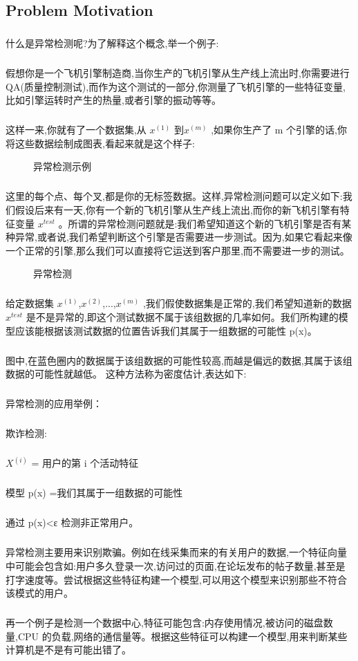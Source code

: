 \documentclass{article}
\begin{document}
\begin{CJK}{UTF8}{gbsn}
\subsection{Problem Motivation}
\subparagraph{}
什么是异常检测呢?为了解释这个概念,举一个例子:
\subparagraph{}
假想你是一个飞机引擎制造商,当你生产的飞机引擎从生产线上流出时,你需要进行 QA(质量控制测试),而作为这个测试的一部分,你测量了飞机引擎的一些特征变量,比如引擎运转时产生的热量,或者引擎的振动等等。
\subparagraph{}
这样一来,你就有了一个数据集,从 $x^{(1)}$ 到$x^{(m)}$  ,如果你生产了 m 个引擎的话,你将这些数据绘制成图表,看起来就是这个样子:
\begin{figure}[H]
\caption{异常检测示例}
\label{fig:901}
\end{figure}
\subparagraph{}
这里的每个点、每个叉,都是你的无标签数据。这样,异常检测问题可以定义如下:我们假设后来有一天,你有一个新的飞机引擎从生产线上流出,而你的新飞机引擎有特征变量 $x^{test}$ 。所谓的异常检测问题就是:我们希望知道这个新的飞机引擎是否有某种异常,或者说,我们希望判断这个引擎是否需要进一步测试。因为,如果它看起来像一个正常的引擎,那么我们可以直接将它运送到客户那里,而不需要进一步的测试。
\begin{figure}[H]
\caption{异常检测}
\label{fig:902}
\end{figure}
\subparagraph{}
给定数据集 $x^{(1)}$,$x^{(2)}$,...,$x^{(m)}$ ,我们假使数据集是正常的,我们希望知道新的数据 $x^{test}$ 是不是异常的,即这个测试数据不属于该组数据的几率如何。我们所构建的模型应该能根据该测试数据的位置告诉我们其属于一组数据的可能性 p(x)。
\subparagraph{}
图中,在蓝色圈内的数据属于该组数据的可能性较高,而越是偏远的数据,其属于该组数据的可能性就越低。
这种方法称为密度估计,表达如下:
\begin{figure}[H]
\label{fig:902}
\end{figure}
\subparagraph{}
异常检测的应用举例：
\begin{figure}[H]
\label{fig:904}
\end{figure}
\subparagraph{}
欺诈检测:
\subparagraph{}
$X^{(i)}$ = 用户的第 i 个活动特征
\subparagraph{}
模型 p(x) =我们其属于一组数据的可能性
\subparagraph{}
通过 p(x)<ε 检测非正常用户。
\subparagraph{}
异常检测主要用来识别欺骗。例如在线采集而来的有关用户的数据,一个特征向量中可能会包含如:用户多久登录一次,访问过的页面,在论坛发布的帖子数量,甚至是打字速度等。尝试根据这些特征构建一个模型,可以用这个模型来识别那些不符合该模式的用户。
\subparagraph{}
再一个例子是检测一个数据中心,特征可能包含:内存使用情况,被访问的磁盘数量,CPU 的负载,网络的通信量等。根据这些特征可以构建一个模型,用来判断某些计算机是不是有可能出错了。
\begin{figure}[H]
\label{fig:905}
\end{figure}

\end{CJK}
\end{document}

